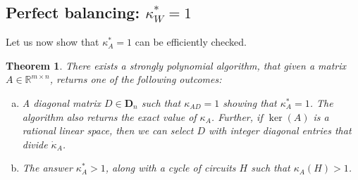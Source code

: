 \documentclass[11pt, a4paper]{article}
\newcommand{\Le}{\kappa}
\newcommand{\1}{\mathbbm{1}}
\newcommand{\kd}{{\dot{\kappa}}}
\newcommand{\bD}{\mathbf{D}}
\newtheorem{theorem}{Theorem}[section]
\theoremstyle{case}
\newcommand{\R}{\mathbb{R}}
\begin{document}
\subsection{Perfect balancing: $\Le^*_W=1$}
Let us now show that  $\kappa^*_A=1$ can be efficiently checked.
\begin{theorem}\label{thm:kappa-star-1}
There exists a strongly polynomial algorithm, that given a matrix $A\in\R^{m\times n}$, returns one of the following outcomes:
\begin{enumerate}[(a)]
\item \label{i:outcome_TU} 
A diagonal matrix $D\in{\bD}_n$ such that $\kappa_{AD}=1$ showing that $\kappa^*_A=1$. The algorithm also returns the exact value of $\kappa_A$.
Further, if $\ker(A)$ is a rational linear space, then we can select $D$ with integer diagonal entries that divide $\kd_A$.
\item \label{i:outcome_not_TU} The answer $\kappa^*_A>1$, along with a cycle of circuits $H$ such that $\kappa_A(H) > 1$.
\end{enumerate}
\end{theorem}
\end{document}
